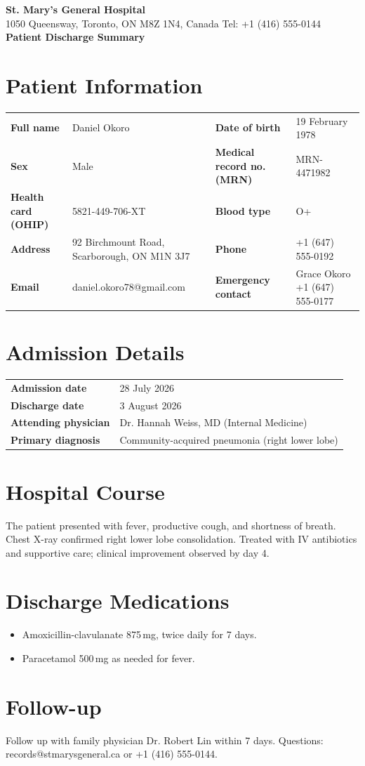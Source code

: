 \documentclass[11pt,a4paper]{article}
\begin{document}
{\Huge\bfseries\color{accent} St. Mary's General Hospital}\\[0.2em]
{\normalsize 1050 Queensway, Toronto, ON M8Z 1N4, Canada \quad Tel: +1 (416) 555-0144}\\[0.8em]
{\LARGE\bfseries Patient Discharge Summary}

\section{Patient Information}
\begin{tabularx}{\linewidth}{@{}>{\bfseries}l X >{\bfseries}l X@{}}
Full name & Daniel Okoro & Date of birth & 19 February 1978 \\
Sex & Male & Medical record no. (MRN) & MRN-4471982 \\
Health card (OHIP) & 5821-449-706-XT & Blood type & O+ \\
Address & 92 Birchmount Road, Scarborough, ON M1N 3J7 & Phone & +1 (647) 555-0192 \\
Email & daniel.okoro78@gmail.com & Emergency contact & Grace Okoro +1 (647) 555-0177 \\
\end{tabularx}

\section{Admission Details}
\begin{tabularx}{\linewidth}{@{}>{\bfseries}l X@{}}
Admission date & 28 July 2026 \\
Discharge date & 3 August 2026 \\
Attending physician & Dr. Hannah Weiss, MD (Internal Medicine) \\
Primary diagnosis & Community-acquired pneumonia (right lower lobe) \\
\end{tabularx}

\section{Hospital Course}
The patient presented with fever, productive cough, and shortness of breath.
Chest X-ray confirmed right lower lobe consolidation. Treated with IV antibiotics
and supportive care; clinical improvement observed by day 4.

\section{Discharge Medications}
\begin{itemize}[leftmargin=1.4em]
  \item Amoxicillin-clavulanate 875\,mg, twice daily for 7 days.
  \item Paracetamol 500\,mg as needed for fever.
\end{itemize}

\section{Follow-up}
Follow up with family physician Dr. Robert Lin within 7 days.
Questions: records@stmarysgeneral.ca or +1 (416) 555-0144.
\end{document}
